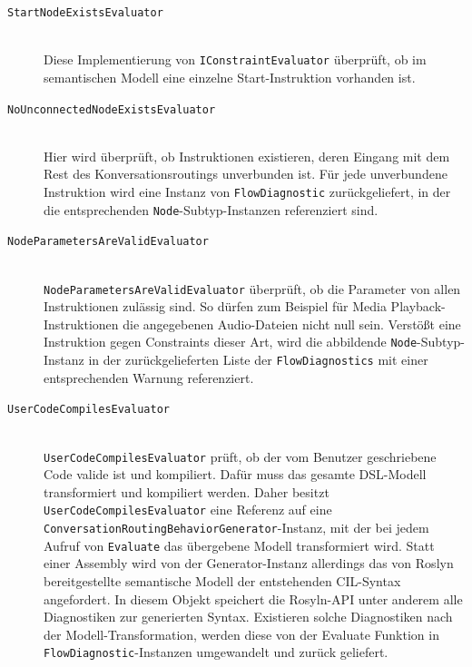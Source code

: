 \begin{description}
\item[\texttt{StartNodeExistsEvaluator}] \hfill \\
Diese Implementierung von \texttt{IConstraintEvaluator} überprüft, ob im semantischen Modell eine einzelne Start-Instruktion vorhanden ist.
\item[\texttt{NoUnconnectedNodeExistsEvaluator}] \hfill \\
Hier wird überprüft, ob Instruktionen existieren, deren Eingang mit dem Rest des Konversationsroutings unverbunden ist. Für jede unverbundene Instruktion wird eine Instanz von \texttt{FlowDiagnostic} zurückgeliefert, in der die entsprechenden \texttt{Node}-Subtyp-Instanzen referenziert sind.
\item[\texttt{NodeParametersAreValidEvaluator}] \hfill \\
\texttt{NodeParametersAreValidEvaluator} überprüft, ob die Parameter von allen Instruktionen zulässig sind. So dürfen zum Beispiel für Media Playback-Instruktionen die angegebenen Audio-Dateien nicht null sein. Verstößt eine Instruktion gegen Constraints dieser Art, wird die abbildende \texttt{Node}-Subtyp-Instanz in der zurückgelieferten Liste der \texttt{FlowDiagnostics} mit einer entsprechenden Warnung referenziert.
\item[\texttt{UserCodeCompilesEvaluator}] \hfill \\
\texttt{UserCodeCompilesEvaluator} prüft, ob der vom Benutzer geschriebene Code valide ist und kompiliert. Dafür muss das gesamte DSL-Modell transformiert und kompiliert werden. Daher besitzt \texttt{UserCodeCompilesEvaluator} eine Referenz auf eine \texttt{ConversationRoutingBehaviorGenerator}-Instanz, mit der bei jedem Aufruf von \texttt{Evaluate} das übergebene Modell transformiert wird. Statt einer Assembly wird von der Generator-Instanz allerdings das von Roslyn bereitgestellte semantische Modell der entstehenden CIL-Syntax angefordert. In diesem Objekt speichert die Rosyln-API unter anderem alle Diagnostiken zur generierten Syntax. Existieren solche Diagnostiken nach der Modell-Transformation, werden diese von der Evaluate Funktion in \texttt{FlowDiagnostic}-Instanzen umgewandelt und zurück geliefert.
\end{description}
